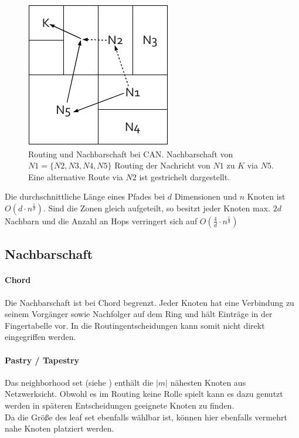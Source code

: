\begin{figure}[htbp]
\centering
\includegraphics{grafics/can_routing.pdf}
\caption{Routing und Nachbarschaft bei CAN. Nachbarschaft von $N1 = \{N2, N3, N4, N5\}$ Routing der Nachricht von $N1$ zu $K$ via $N5$. Eine alternative Route via $N2$ ist gestrichelt dargestellt.}
\label{fig:can_routing}
\end{figure}

Die durchschnittliche Länge eines Pfades bei $d$ Dimensionen und $n$ Knoten ist $O(d\cdot n^\frac{1}{d})$. Sind die Zonen gleich aufgeteilt, so besitzt jeder Knoten max. $2d$ Nachbarn und die Anzahl an Hops verringert sich auf $O(\frac{4}{d}\cdot n^\frac{1}{d})$


\subsection{Nachbarschaft}
\paragraph{Chord}
Die Nachbarschaft ist bei Chord begrenzt. Jeder Knoten hat eine Verbindung zu seinem Vorgänger sowie Nachfolger auf dem Ring und hält Einträge in der Fingertabelle vor. In die Routingentscheidungen kann somit nicht direkt eingegriffen werden.


\paragraph{Pastry / Tapestry}
Das neighborhood set (siehe ) enthält die $|m|$ nähesten Knoten aus Netzwerksicht. Obwohl es im Routing keine Rolle spielt kann es dazu genutzt werden in späteren Entscheidungen geeignete Knoten zu finden.\\
Da die Größe des leaf set ebenfalls wählbar ist, können hier ebenfalls vermehrt nahe Knoten platziert werden.

